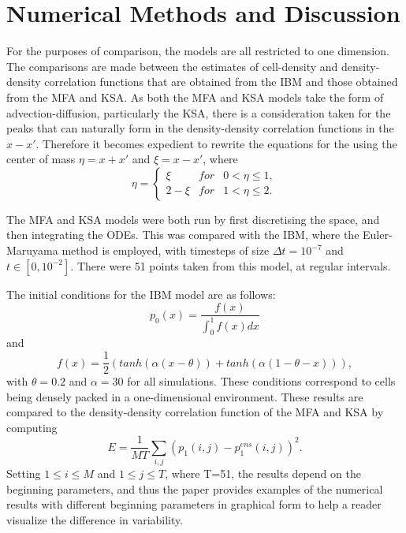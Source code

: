 \documentclass[12pt,letterpaper,cm]{article}
\renewcommand{\.}{\cdot}
\newcommand{\<}{\langle}
\renewcommand{\>}{\rangle}
\begin{document}
	\section{Numerical Methods and Discussion}
	\indent 
	
	
	For the purposes of comparison, the models are all restricted to one dimension.  The comparisons are made between the estimates of cell-density and density-density correlation functions that are obtained from the IBM and those obtained from the MFA and KSA.  As both the MFA and KSA models take the form of advection-diffusion, particularly the KSA, there is a consideration taken for the peaks that can naturally form in the density-density correlation functions in the $x-x'$.  Therefore it becomes expedient to rewrite the equations for the using the center of mass $\eta=x+x'$ and $\xi=x-x'$, where 
	\[
	\eta =  \left\lbrace \begin{array}{lll}
	\xi&for& 0<\eta\leq 1,\\
	2-\xi&for&1<\eta\leq 2.
	\end{array} \right. \]
	
	The MFA and KSA models were both run by first discretising the space, and then integrating the ODEs.  This was compared with the IBM, where the Euler-Maruyama method is employed, with timesteps of size $\Delta t=10^{-7}$ and $t\in [0,10^{-2}]$.  There were 51 points taken from this model, at regular intervals. 
	
	The initial conditions for the IBM model are as follows:
	\[
	p_0(x)=\frac{f(x)}{\int_0^1 f(x)dx}
	\]
	and 
	\[
	f(x)=\frac{1}{2}(tanh(\alpha(x-\theta))+tanh(\alpha(1-\theta-x))),
	\]
	with $\theta=0.2$ and $\alpha=30$ for all simulations.  These conditions correspond to cells being densely packed in a one-dimensional environment.  These results are compared to the density-density correlation function of the MFA and KSA by computing 
	\[
	E=\frac{1}{MT}\sum\limits_{i,j}(p_1(i,j)-p^{ens}_1(i,j))^2. 
	\]   Setting $1\leq i\leq M$ and $1\leq j \leq T$, where T=51, the results depend on the beginning parameters, and thus the paper provides examples of the numerical results with different beginning parameters in graphical form to help a reader visualize the difference in variability.
	
\end{document}
